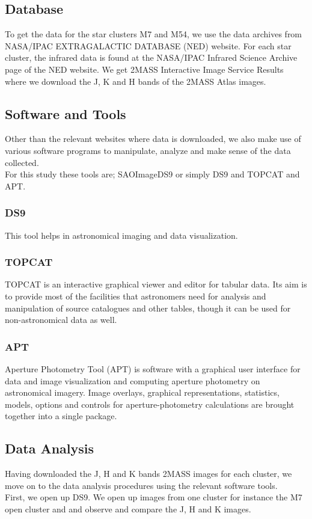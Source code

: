 \documentclass[12pt]{article}
\begin{document}
		\subsection{Database}
		To get the data for the star clusters M7 and M54, we use the data archives from NASA/IPAC EXTRAGALACTIC DATABASE (NED) website. For each star cluster, the infrared data is found at the NASA/IPAC Infrared Science Archive page of the NED website. We get 2MASS Interactive Image Service Results where we download the J, K and H bands of the 2MASS Atlas images.
		\subsection{Software and Tools}
		Other than the relevant websites where data is downloaded, we also make use of various software programs to manipulate, analyze and make sense of the data collected.\\
		For this study these tools are; SAOImageDS9 or simply DS9 and TOPCAT and APT.
		\subsubsection{DS9}
		This tool helps in astronomical imaging and data visualization.
		\subsubsection{TOPCAT}
		TOPCAT is an interactive graphical viewer and editor for tabular data. Its aim is to provide most of the facilities that astronomers need for analysis and manipulation of source catalogues and other tables, though it can be used for non-astronomical data as well.
		\subsubsection{APT}
		Aperture Photometry Tool (APT) is software with a graphical user interface for data and image visualization and computing aperture photometry on astronomical imagery. Image overlays, graphical representations, statistics, models, options and controls for aperture-photometry calculations are brought together into a single package.
		\subsection{Data Analysis}
		Having downloaded the J, H and K bands 2MASS images for each cluster, we move on to the data analysis procedures using the relevant software tools.\\
		First, we open up DS9. We open up images from one cluster for instance the M7 open cluster and and observe and compare the J, H and K images.
\end{document}

